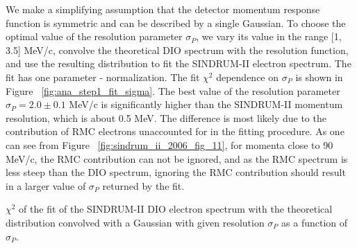 We make a simplifying assumption that the detector momentum response function is symmetric and
can be described by a single Gaussian. To choose the optimal value of the resolution parameter
$\sigma_P$, we vary its value in the range [1, 3.5] MeV/c, convolve the theoretical DIO spectrum
with the resolution function, and use the resulting distribution to fit the SINDRUM-II
electron spectrum. The fit has one parameter - normalization. The fit $\chi^2$ dependence
on $\sigma_P$ is shown in Figure ~\ref{fig:ana_step1_fit_sigma}.
%
The best value of the resolution parameter $\sigma_P = 2.0 \pm 0.1$ MeV/c is significantly
higher than the SINDRUM-II momentum resolution, which is about 0.5 MeV.
The difference is most likely due to the contribution of RMC electrons unaccounted for
in the fitting procedure. As one can see from Figure ~\ref{fig:sindrum_ii_2006_fig_11},
for momenta close to 90 MeV/c, the RMC contribution can not be ignored, and as the RMC spectrum
is less steep than the DIO spectrum, ignoring the RMC contribution should result in a
larger value of $\sigma_P$ returned by the fit. 

\vspace{0.2in}
%
 {
  \label{fig:ana_step1_fit_sigma}
  $\chi^2$ of the fit of the SINDRUM-II DIO electron spectrum with the theoretical distribution
  convolved with a Gaussian with given resolution $\sigma_P$ as a function of $\sigma_P$.
}
\vspace{0.2in}

